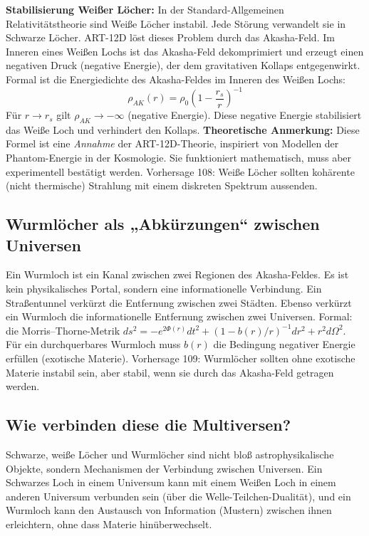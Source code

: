 \textbf{Stabilisierung Weißer Löcher:} In der Standard-Allgemeinen Relativitätstheorie sind Weiße Löcher instabil. Jede Störung verwandelt sie in Schwarze Löcher. ART-12D löst dieses Problem durch das Akasha-Feld. Im Inneren eines Weißen Lochs ist das Akasha-Feld dekomprimiert und erzeugt einen negativen Druck (negative Energie), der dem gravitativen Kollaps entgegenwirkt. Formal ist die Energiedichte des Akasha-Feldes im Inneren des Weißen Lochs:
\begin{equation}
\rho_{AK}(r) = \rho_0 \left(1 - \frac{r_s}{r}\right)^{-1}
\end{equation}
Für $r \to r_s$ gilt $\rho_{AK} \to -\infty$ (negative Energie). Diese negative Energie stabilisiert das Weiße Loch und verhindert den Kollaps. \textbf{Theoretische Anmerkung:} Diese Formel ist eine \textit{Annahme} der ART-12D-Theorie, inspiriert von Modellen der Phantom-Energie in der Kosmologie. Sie funktioniert mathematisch, muss aber experimentell bestätigt werden. Vorhersage 108: Weiße Löcher sollten kohärente (nicht thermische) Strahlung mit einem diskreten Spektrum aussenden.

\subsection{Wurmlöcher als „Abkürzungen`` zwischen Universen}
Ein Wurmloch ist ein Kanal zwischen zwei Regionen des Akasha-Feldes. Es ist kein physikalisches Portal, sondern eine informationelle Verbindung. Ein Straßentunnel verkürzt die Entfernung zwischen zwei Städten. Ebenso verkürzt ein Wurmloch die informationelle Entfernung zwischen zwei Universen. Formal: die Morris--Thorne-Metrik $ds^2 = -e^{2\Phi(r)}dt^2 + (1-b(r)/r)^{-1}dr^2 + r^2 d\Omega^2$. Für ein durchquerbares Wurmloch muss $b(r)$ die Bedingung negativer Energie erfüllen (exotische Materie). Vorhersage 109: Wurmlöcher sollten ohne exotische Materie instabil sein, aber stabil, wenn sie durch das Akasha-Feld getragen werden.

\subsection{Wie verbinden diese die Multiversen?}
Schwarze, weiße Löcher und Wurmlöcher sind nicht bloß astrophysikalische Objekte, sondern Mechanismen der Verbindung zwischen Universen. Ein Schwarzes Loch in einem Universum kann mit einem Weißen Loch in einem anderen Universum verbunden sein (über die Welle-Teilchen-Dualität), und ein Wurmloch kann den Austausch von Information (Mustern) zwischen ihnen erleichtern, ohne dass Materie hinüberwechselt.

